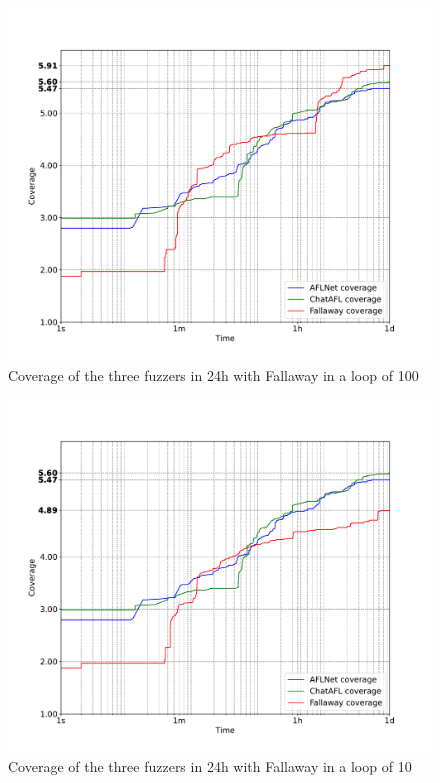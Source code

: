 \begin{figure}[H]
    \centering
    \includegraphics[width=1\textwidth]{Images/coverage_over_time_lighttpd-1day-100l.pdf}
    \caption{Coverage of the three fuzzers in 24h with Fallaway in a loop of 100}
    \label{fig:coverage_1day_100l}
\end{figure}

\begin{figure}[H]
    \centering
    \includegraphics[width=1\textwidth]{Images/coverage_over_time_lighttpd-1day-10l.pdf}
    \caption{Coverage of the three fuzzers in 24h with Fallaway in a loop of 10}
    \label{fig:coverage_1day_10l}
\end{figure}

